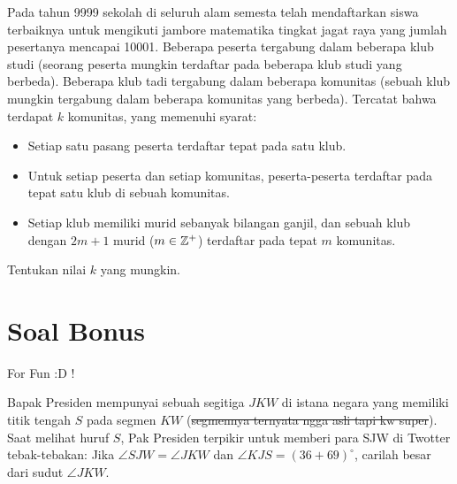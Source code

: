 \documentclass[12pt]{scrartcl}
\begin{document}
	\begin{soalbaru}
	Pada tahun 9999 sekolah di seluruh alam semesta telah mendaftarkan siswa terbaiknya untuk mengikuti jambore matematika tingkat jagat raya yang jumlah pesertanya mencapai 10001. Beberapa peserta tergabung dalam beberapa klub studi (seorang peserta mungkin terdaftar pada beberapa klub studi yang berbeda). Beberapa klub tadi tergabung dalam beberapa komunitas (sebuah klub mungkin tergabung dalam beberapa komunitas yang berbeda). Tercatat bahwa terdapat $k$ komunitas, yang memenuhi syarat:
	\begin{itemize}
	\item Setiap satu pasang peserta terdaftar tepat pada satu klub.
	\item Untuk setiap peserta dan setiap komunitas, peserta-peserta terdaftar pada tepat satu klub di sebuah komunitas.
	\item Setiap klub memiliki murid sebanyak bilangan ganjil, dan sebuah klub dengan $2m+1$ murid ($m \in \mathbb Z^+$) terdaftar pada tepat $m$ komunitas.
	\end{itemize}
	Tentukan nilai $k$ yang mungkin.
	
	
	\end{soalbaru}
	
	
	\section{Soal Bonus}
	
	For Fun :D !
	\begin{soalbaru}
	Bapak Presiden mempunyai sebuah segitiga $JKW$ di istana negara yang memiliki titik tengah $S$ pada segmen $KW$ (\sout{segmennya ternyata ngga asli tapi kw super}). Saat melihat huruf $S$, Pak Presiden terpikir untuk memberi para SJW di Twotter tebak-tebakan: Jika $\angle SJW = \angle JKW$ dan $\angle KJS = (36+69)^\circ$, carilah besar dari sudut $\angle JKW$.
	\end{soalbaru}
\end{document}
